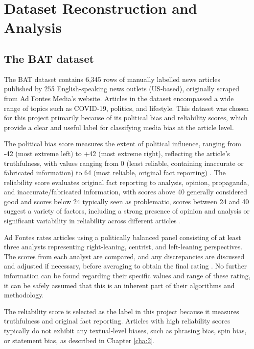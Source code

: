 \chapter{Dataset Reconstruction and Analysis}
\label{cha:3}

\section{The BAT dataset} \label{bat-characteristics}

The BAT dataset \cite{spinde-2023-bat} contains 6,345 rows of manually labelled news articles published by 255 English-speaking news outlets (US-based), originally scraped from Ad Fontes Media's website. Articles in the dataset encompassed a wide range of topics such as COVID-19, politics, and lifestyle. This dataset was chosen for this project primarily because of its political bias and reliability scores, which provide a clear and useful label for classifying media bias at the article level.

The political bias score measures the extent of political influence, ranging from -42 (most extreme left) to +42 (most extreme right), reflecting the article's truthfulness, with values ranging from 0 (least reliable, containing inaccurate or fabricated information) to 64 (most reliable, original fact reporting) \cite{adfontes-bias-reliability}. The reliability score evaluates original fact reporting to analysis, opinion, propaganda, and inaccurate/fabricated information, with scores above 40 generally considered good and scores below 24 typically seen as problematic, scores between 24 and 40 suggest a variety of factors, including a strong presence of opinion and analysis or significant variability in reliability across different articles \cite{adfontes-bias-reliability}.

Ad Fontes rates articles using a politically balanced panel consisting of at least three analysts representing right-leaning, centrist, and left-leaning perspectives. The scores from each analyst are compared, and any discrepancies are discussed and adjusted if necessary, before averaging to obtain the final rating \cite{adfontes-methodology}. No further information can be found regarding their specific values and range of these rating, it can be safely assumed that this is an inherent part of their algorithms and methodology.

The reliability score is selected as the label in this project because it measures truthfulness and original fact reporting. Articles with high reliability scores typically do not exhibit any textual-level biases, such as phrasing bias, spin bias, or statement bias, as described in Chapter \ref{cha:2}.

